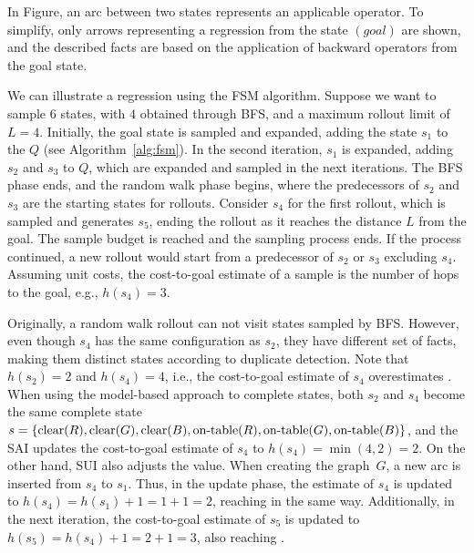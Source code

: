 \begin{figure}[h]
\end{figure}

In Figure, an arc between two states represents an applicable operator.
To simplify, only arrows representing a regression from the state $(goal)$ are shown, and the described facts are based on the application of backward operators from the goal state.

We can illustrate a regression using the FSM algorithm. Suppose we want to sample $6$ states, with $4$ obtained through BFS, and a maximum rollout limit of $L=4$. Initially, the goal state is sampled and expanded, adding the state $s_1$ to the $Q$ (see Algorithm~\ref{alg:fsm}). In the second iteration, $s_1$ is expanded, adding $s_2$ and $s_3$ to $Q$, which are expanded and sampled in the next iterations. The BFS phase ends, and the random walk phase begins, where the predecessors of $s_2$ and $s_3$ are the starting states for rollouts. Consider $s_4$ for the first rollout, which is sampled and generates $s_5$, ending the rollout as it reaches the distance $L$ from the goal. The sample budget is reached and the sampling process ends. If the process continued, a new rollout would start from a predecessor of $s_2$ or $s_3$ excluding $s_4$. Assuming unit costs, the cost-to-goal estimate of a sample is the number of hops to the goal, e.g., $h(s_4)=3$.

Originally, a random walk rollout can not visit states sampled by BFS. However, even though $s_4$ has the same configuration as $s_2$, they have different set of facts, making them distinct states according to duplicate detection. Note that $h(s_2)=2$ and $h(s_4)=4$, i.e., the cost-to-goal estimate of $s_4$ overestimates \hstar. When using the model-based approach to complete states, both $s_2$ and $s_4$ become the same complete state $s = \{\text{clear}(R),\text{clear}(G),\text{clear}(B),\text{on-table}(R),\text{on-table}(G),\text{on-table}(B)\}$, and the SAI updates the cost-to-goal estimate of $s_4$ to $h(s_4)=\min(4,2)=2$. On the other hand, SUI also adjusts the value. When creating the graph~$G$, a new arc is inserted from $s_4$ to $s_1$. Thus, in the update phase, the estimate of $s_4$ is updated to $h(s_4)=h(s_1)+1=1+1=2$, reaching \hstar in the same way. Additionally, in the next iteration, the cost-to-goal estimate of $s_5$ is updated to $h(s_5)=h(s_4)+1=2+1=3$, also reaching \hstar.

